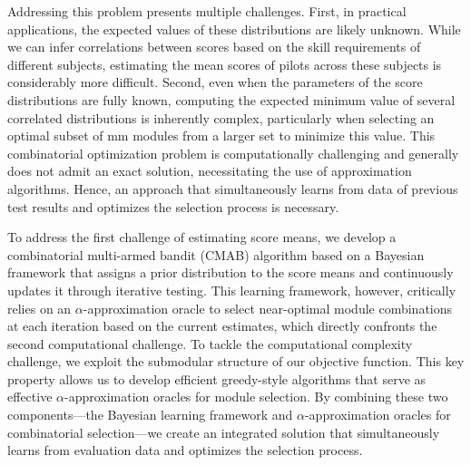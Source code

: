 \documentclass[opre,sglanonrev]{informs4}
\begin{document}
Addressing this problem presents multiple challenges. First, in practical applications, the expected values of these distributions are likely unknown. While we can infer correlations between scores based on the skill requirements of different subjects, estimating the mean scores of pilots across these subjects is considerably more difficult. Second, even when the parameters of the score distributions are fully known, computing the expected minimum value of several correlated distributions is inherently complex, particularly when selecting an optimal subset of mm modules from a larger set to minimize this value. This combinatorial optimization problem is computationally challenging and generally does not admit an exact solution, necessitating the use of approximation algorithms. Hence, an approach that simultaneously learns from data of previous test results and optimizes the selection process is necessary.

To address the first challenge of estimating score means, we develop a combinatorial multi-armed bandit (CMAB) algorithm based on a Bayesian framework that assigns a prior distribution to the score means and continuously updates it through iterative testing. This learning framework, however, critically relies on an $\alpha$-approximation oracle to select near-optimal module combinations at each iteration based on the current estimates, which directly confronts the second computational challenge. To tackle the computational complexity challenge, we exploit the submodular structure of our objective function. This key property allows us to develop efficient greedy-style algorithms that serve as effective $\alpha$-approximation oracles for module selection. By combining these two components—the Bayesian learning framework and $\alpha$-approximation oracles for combinatorial selection—we create an integrated solution that simultaneously learns from evaluation data and optimizes the selection process. 
\end{document}
